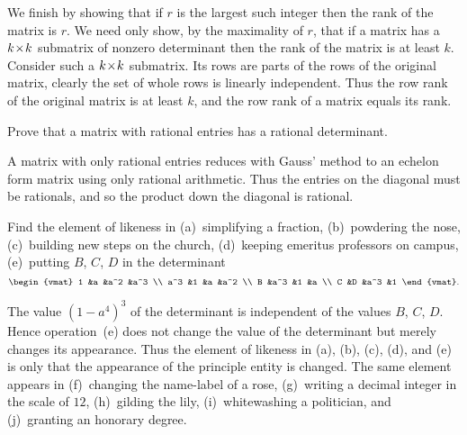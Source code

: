 \begin{exercises}
\begin{answer}
      We finish by showing that if \( r \) is the largest such integer then
      the rank of the matrix is \( r \).
      We need only show, by the maximality of \( r \),
      that if a matrix has a \( k \! \times \! k \) submatrix of
      nonzero determinant then the rank of the matrix is at least \( k \).
      Consider such a \( k \! \times \! k \) submatrix.
      Its rows are parts of the rows of the original matrix, clearly the
      set of whole rows is linearly independent.
      Thus the row rank of the original matrix is at least \( k \), and the row
      rank of a matrix equals its rank.  
   \end{answer}
  \recommended \item
    Prove that a matrix with rational entries has a rational determinant.
    \begin{answer}
      A matrix with only rational entries reduces with Gauss'
      method to an echelon form matrix using only rational arithmetic.
      Thus the entries on the diagonal must be rationals, and so the product
      down the diagonal is rational.  
    \end{answer}
  \puzzle \item 
     \cite{Monthly53p115}
     Find the element of likeness in (a)~simplifying a fraction, (b)~powdering
     the nose, (c)~building new steps on the church, (d)~keeping emeritus
     professors on campus, (e)~putting \( B \), \( C \), \( D \) in the
     determinant
     \begin{equation*}
       \begin{vmat}
         1   &a   &a^2  &a^3  \\
         a^3 &1   &a    &a^2  \\
         B   &a^3 &1    &a    \\
         C   &D   &a^3  &1
       \end{vmat}.
     \end{equation*}
     \begin{answer}
       \answerasgiven
       The value \( (1-a^4)^3 \) of the determinant is independent of the
       values \( B \), \( C \), \( D \).
       Hence operation~(e) does not change the value of the determinant
       but merely changes its appearance.
       Thus the element of likeness in (a), (b), (c), (d), and (e) is
       only that the appearance of the principle entity is changed.
       The same element appears in (f)~changing the name-label of a rose,
       (g)~writing a decimal integer in the scale of \( 12 \), (h)~gilding
       the lily, (i)~whitewashing a politician, and (j)~granting an honorary
       degree.  
    \end{answer}
\end{exercises}



















